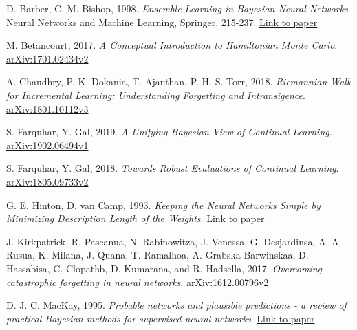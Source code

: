 \documentclass[a4paper,11=0pt]{article}
\begin{document}
\begin{thebibliography}{8}

 D. Barber, C. M. Bishop, 1998. \textit{Ensemble Learning in Bayesian Neural Networks}. Neural Networks and Machine Learning, Springer, 215-237. \href{https://www.microsoft.com/en-us/research/wp-content/uploads/2016/02/bishop-ensemble-nato-98.pdf}{Link to paper}

 M. Betancourt, 2017. \textit{A Conceptual Introduction to Hamiltonian Monte Carlo}. \href{https://arxiv.org/abs/1701.02434}{arXiv:1701.02434v2}

 A. Chaudhry, P. K. Dokania, T. Ajanthan, P. H. S. Torr, 2018. \textit{Riemannian Walk for Incremental Learning: Understanding Forgetting and Intransigence}. \href{https://arxiv.org/abs/1801.10112}{arXiv:1801.10112v3}

 S. Farquhar, Y. Gal, 2019. \textit{A Unifying Bayesian View of Continual Learning}. \href{https://arxiv.org/abs/1902.06494}{arXiv:1902.06494v1}

 S. Farquhar, Y. Gal, 2018. \textit{Towards Robust Evaluations of Continual Learning}. \href{https://arxiv.org/abs/1805.09733}{arXiv:1805.09733v2}

 G. E. Hinton, D. van Camp, 1993. \textit{Keeping the
Neural Networks Simple by Minimizing Description Length of the Weights}. \href{http://www.cs.toronto.edu/~fritz/absps/colt93.pdf}{Link to paper}

 J. Kirkpatrick, R. Pascanua, N. Rabinowitza, J. Venessa, G. Desjardinsa, A. A. Rusua, K. Milana, J. Quana, T. Ramalhoa, A. Grabska-Barwinskaa, D. Hassabisa, C. Clopathb, D. Kumarana, and R. Hadsella, 2017. \textit{Overcoming catastrophic forgetting in neural networks}. \href{https://arxiv.org/abs/1612.00796}{arXiv:1612.00796v2}


 D. J. C. MacKay, 1995. \textit{Probable networks and plausible predictions - a review of practical Bayesian methods for supervised neural networks}. \href{https://citeseerx.ist.psu.edu/viewdoc/download;jsessionid=F4F7C99DECF23AEDF5BAAF5E25DE86F9?doi=10.1.1.136.4011&rep=rep1&type=pdf}{Link to paper}


\end{thebibliography}
\end{document}
